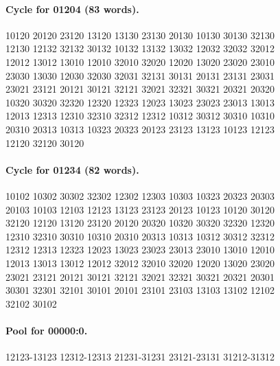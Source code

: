 \documentclass[11pt]{article}
\theoremstyle{remark}
\numberwithin{equation}{section}
\numberwithin{table}{section}
\begin{document}
\paragraph{Cycle for 01204 (83 words).}
\begingroup\footnotesize\ttfamily\begin{flushleft}
10120 20120 23120 13120 13130 23130 20130 10130 30130 32130\\
12130 12132 32132 30132 10132 13132 13032 12032 32032 32012\\
12012 13012 13010 12010 32010 32020 12020 13020 23020 23010\\
23030 13030 12030 32030 32031 32131 30131 20131 23131 23031\\
23021 23121 20121 30121 32121 32021 32321 30321 20321 20320\\
10320 30320 32320 12320 12323 12023 13023 23023 23013 13013\\
12013 12313 12310 32310 32312 12312 10312 30312 30310 10310\\
20310 20313 10313 10323 20323 20123 23123 13123 10123 12123\\
12120 32120 30120\\
\end{flushleft}\endgroup
\paragraph{Cycle for 01234 (82 words).}
\begingroup\footnotesize\ttfamily\begin{flushleft}
10102 10302 30302 32302 12302 12303 10303 10323 20323 20303\\
20103 10103 12103 12123 13123 23123 20123 10123 10120 30120\\
32120 12120 13120 23120 20120 20320 10320 30320 32320 12320\\
12310 32310 30310 10310 20310 20313 10313 10312 30312 32312\\
12312 12313 12323 12023 13023 23023 23013 23010 13010 12010\\
12013 13013 13012 12012 32012 32010 32020 12020 13020 23020\\
23021 23121 20121 30121 32121 32021 32321 30321 20321 20301\\
30301 32301 32101 30101 20101 23101 23103 13103 13102 12102\\
32102 30102\\
\end{flushleft}\endgroup
\paragraph{Pool for 00000:0.}
\begingroup\footnotesize\ttfamily\begin{flushleft}
12123-13123 12312-12313 21231-31231 23121-23131 31212-31312\\
\end{flushleft}\endgroup
\end{document}
